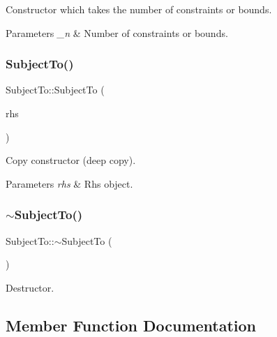 Constructor which takes the number of constraints or bounds. 
\begin{DoxyParams}{Parameters}
{\em \+\_\+n} & Number of constraints or bounds. \\
\hline
\end{DoxyParams}
\mbox{\label{class_subject_to_a83bcd729588d53c53dd57505879681eb}} 
\subsubsection{\texorpdfstring{Subject\+To()}{SubjectTo()}\hspace{0.1cm}{\footnotesize\ttfamily [3/3]}}
{\footnotesize\ttfamily Subject\+To\+::\+Subject\+To (\begin{DoxyParamCaption}\item[{const \hyperlink{class_subject_to}{Subject\+To} \&}]{rhs }\end{DoxyParamCaption})}

Copy constructor (deep copy). 
\begin{DoxyParams}{Parameters}
{\em rhs} & Rhs object. \\
\hline
\end{DoxyParams}
\mbox{\label{class_subject_to_aac46ec3e5c1503400e96952afbb004a1}} 
\subsubsection{\texorpdfstring{$\sim$\+Subject\+To()}{~SubjectTo()}}
{\footnotesize\ttfamily Subject\+To\+::$\sim$\+Subject\+To (\begin{DoxyParamCaption}{ }\end{DoxyParamCaption})\hspace{0.3cm}{\ttfamily [virtual]}}

Destructor. 

\subsection{Member Function Documentation}
\mbox{\label{class_subject_to_a83c1986b050f0ca61105889439463be8}} 
